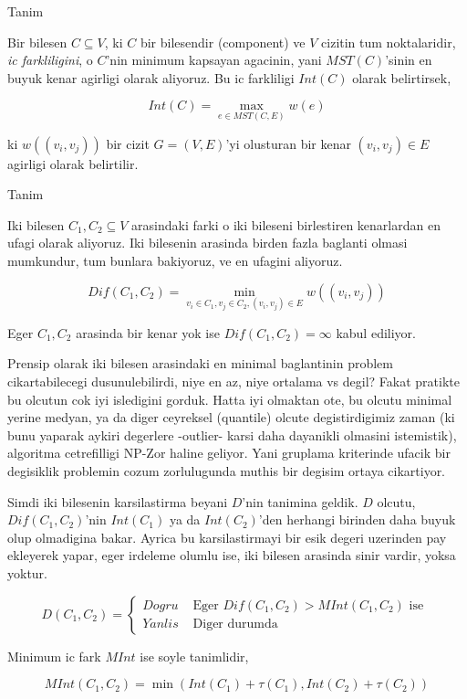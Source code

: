 \documentclass[12pt,fleqn]{article}\usepackage{../common}
\begin{document}
Tanim

Bir bilesen $C \subseteq V$, ki $C$ bir bilesendir (component) ve $V$ cizitin tum
noktalaridir, {\em ic farkliligini}, o $C$'nin minimum kapsayan agacinin,
yani $MST(C)$'sinin en buyuk kenar agirligi olarak aliyoruz. Bu ic farkliligi
$Int(C)$ olarak belirtirsek, 

$$ Int(C) = \max_{e \in MST(C,E)} w(e) $$

ki $w((v_i , v_j))$ bir cizit $G = (V,E)$'yi olusturan bir kenar $(v_i,v_j)
\in E$ agirligi 
olarak belirtilir. 

Tanim

Iki bilesen $C_1,C_2 \subseteq V$ arasindaki farki o iki bileseni
birlestiren kenarlardan en ufagi olarak aliyoruz. Iki bilesenin arasinda
birden fazla baglanti olmasi mumkundur, tum bunlara bakiyoruz, ve en
ufagini aliyoruz.

$$ Dif(C_1,C_2) = \min_{v_i \in C_1, v_j \in C_2, (v_i,v_j) \in E} w((v_i,v_j))$$

Eger $C_1,C_2$ arasinda bir kenar yok ise $Dif(C_1,C_2) = \infty$ kabul
ediliyor. 

Prensip olarak iki bilesen arasindaki en minimal baglantinin problem
cikartabilecegi dusunulebilirdi, niye en az, niye ortalama vs degil? Fakat
pratikte bu olcutun cok iyi isledigini gorduk. Hatta iyi olmaktan ote, bu
olcutu minimal yerine medyan, ya da diger ceyreksel (quantile) olcute
degistirdigimiz zaman (ki bunu yaparak aykiri degerlere -outlier- karsi
daha dayanikli olmasini istemistik), algoritma cetrefilligi NP-Zor haline
geliyor. Yani gruplama kriterinde ufacik bir degisiklik problemin cozum
zorlulugunda muthis bir degisim ortaya cikartiyor. 

Simdi iki bilesenin karsilastirma beyani $D$'nin tanimina geldik. $D$ olcutu,
$Dif(C_1,C_2)$'nin $Int(C_1)$ ya da $Int(C_2)$'den herhangi birinden daha
buyuk olup olmadigina bakar. Ayrica bu karsilastirmayi bir esik degeri
uzerinden pay ekleyerek yapar, eger irdeleme olumlu ise, iki bilesen
arasinda sinir vardir, yoksa yoktur.

$$ 
D(C_1,C_2) = 
\left\{ \begin{array}{ll}
Dogru & \textrm{ Eger } Dif(C_1,C_2) > MInt(C_1,C_2) \textrm{ ise } \\
Yanlis & \textrm{ Diger durumda }
\end{array} \right.
 $$

Minimum ic fark $MInt$ ise soyle tanimlidir,

$$ 
MInt(C_1,C_2) = \min (Int(C_1)+\tau(C_1), Int(C_2)+\tau(C_2))
 $$
\end{document}
